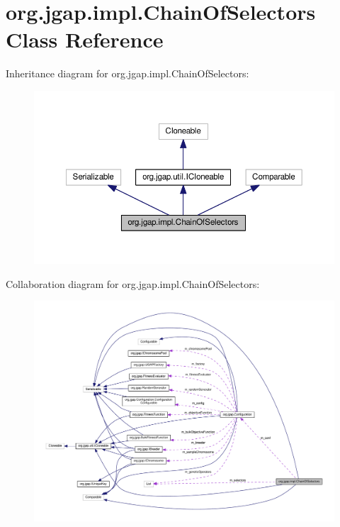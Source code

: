 \hypertarget{classorg_1_1jgap_1_1impl_1_1_chain_of_selectors}{\section{org.\-jgap.\-impl.\-Chain\-Of\-Selectors Class Reference}
\label{classorg_1_1jgap_1_1impl_1_1_chain_of_selectors}
}


Inheritance diagram for org.\-jgap.\-impl.\-Chain\-Of\-Selectors\-:
\nopagebreak
\begin{figure}[H]
\begin{center}
\leavevmode
\includegraphics[width=350pt]{classorg_1_1jgap_1_1impl_1_1_chain_of_selectors__inherit__graph}
\end{center}
\end{figure}


Collaboration diagram for org.\-jgap.\-impl.\-Chain\-Of\-Selectors\-:
\nopagebreak
\begin{figure}[H]
\begin{center}
\leavevmode
\includegraphics[width=350pt]{classorg_1_1jgap_1_1impl_1_1_chain_of_selectors__coll__graph}
\end{center}
\end{figure}
